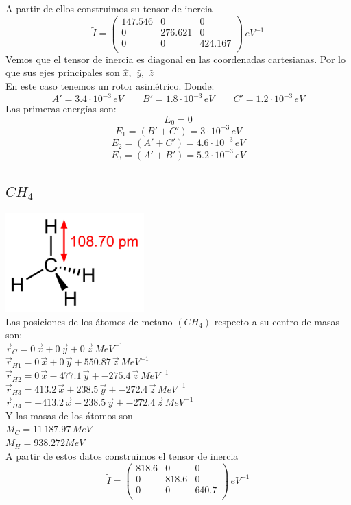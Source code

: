 \documentclass[a4paper]{article}
\begin{document}
 A partir de ellos construimos su tensor de inercia
 $$ \tilde I =
 \begin{pmatrix}
 147.546 & 0 & 0 \\
 0 & 276.621 & 0 \\
 0 & 0 & 424.167\\
 \end{pmatrix}
 \, eV^{-1}
 $$
 Vemos que el tensor de inercia es diagonal en las coordenadas cartesianas. Por lo que sus ejes principales son $ \hat x, \,\ \hat y, \,\ \hat z$\\
 En este caso tenemos un rotor asimétrico. Donde:
 $$A'= 3.4 \cdot 10^{-3}\, eV \qquad B' = 1.8 \cdot 10^{-3}\, eV \qquad C' = 1.2 \cdot 10^{-3}\, eV$$
 Las primeras energías son:
 $$E_0 = 0$$
 $$E_1 = (B'+C') = 3 \cdot 10^{-3}\, eV $$
 $$E_2 = (A'+C') = 4.6 \cdot 10^{-3}\, eV$$
 $$E_3 = (A'+B') = 5.2 \cdot 10^{-3}\, eV$$ 
 \subsection{$CH_4$}
 \includegraphics[width=0.4\textwidth]{metano.png}\\
Las posiciones de los átomos  de metano $(CH_4)$ respecto a su centro de masas son:\\
 $\vec r_C = 0\, \vec x + 0 \, \vec y + 0 \, \vec z \, MeV^{-1}$\\
 $\vec r_{H1} = 0\, \vec x+0 \, \vec y + 550.87 \, \vec z \, MeV^{-1}$\\
 $\vec r_{H2} = 0\, \vec x -477.1 \, \vec y + -275.4\, \vec z \, MeV^{-1}$\\
 $\vec r_{H3} = 413.2\, \vec x + 238.5 \, \vec y + -272.4 \, \vec z \, MeV^{-1}$\\
 $\vec r_{H4} = -413.2 \, \vec x -238.5 \, \vec y + -272.4 \, \vec z \, MeV^{-1}$\\
 
 Y las masas de los átomos son\\
 $M_C = 11\, 187.97 \, MeV$\\
 $M_H = 938.272 MeV$\\
 
 A partir de estos datos construimos el tensor de inercia
 $$ \tilde I =
 \begin{pmatrix}
 818.6 & 0 & 0 \\
 0 & 818.6 & 0 \\
 0 & 0 & 640.7\\
 \end{pmatrix}
 \, eV^{-1}
 $$
 
\end{document}
